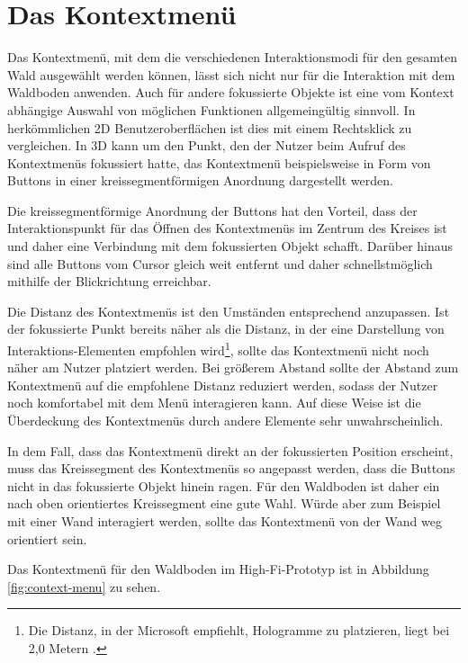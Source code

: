 \section{Das Kontextmenü}
Das Kontextmenü, mit dem die verschiedenen Interaktionsmodi für den gesamten Wald ausgewählt werden können, lässt sich nicht nur für die Interaktion mit dem Waldboden anwenden. Auch für andere fokussierte Objekte ist eine vom Kontext abhängige Auswahl von möglichen Funktionen allgemeingültig sinnvoll. In herkömmlichen 2D Benutzeroberflächen ist dies mit einem Rechtsklick zu vergleichen. In 3D kann um den Punkt, den der Nutzer beim Aufruf des Kontextmenüs fokussiert hatte, das Kontextmenü beispielsweise in Form von Buttons in einer kreissegmentförmigen Anordnung dargestellt werden.

Die kreissegmentförmige Anordnung der Buttons hat den Vorteil, dass der Interaktionspunkt für das Öffnen des Kontextmenüs im Zentrum des Kreises ist und daher eine Verbindung mit dem fokussierten Objekt schafft. Darüber hinaus sind alle Buttons vom Cursor gleich weit entfernt und daher schnellstmöglich mithilfe der Blickrichtung erreichbar.

Die Distanz des Kontextmenüs ist den Umständen entsprechend anzupassen. Ist der fokussierte Punkt bereits näher als die Distanz, in der eine Darstellung von Interaktions-Elementen empfohlen wird\footnote{Die Distanz, in der Microsoft empfiehlt, Hologramme zu platzieren, liegt bei 2,0 Metern \cite{windows2017interaction}.}, sollte das Kontextmenü nicht noch näher am Nutzer platziert werden. Bei größerem Abstand sollte der Abstand zum Kontextmenü auf die empfohlene Distanz reduziert werden, sodass der Nutzer noch komfortabel mit dem Menü interagieren kann. Auf diese Weise ist die Überdeckung des Kontextmenüs durch andere Elemente sehr unwahrscheinlich.

In dem Fall, dass das Kontextmenü direkt an der fokussierten Position erscheint, muss das Kreissegment des Kontextmenüs so angepasst werden, dass die Buttons nicht in das fokussierte Objekt hinein ragen. Für den Waldboden ist daher ein nach oben orientiertes Kreissegment eine gute Wahl. Würde aber zum Beispiel mit einer Wand interagiert werden, sollte das Kontextmenü von der Wand weg orientiert sein.

Das Kontextmenü für den Waldboden im High-Fi-Prototyp ist in Abbildung \ref{fig:context-menu} zu sehen.

